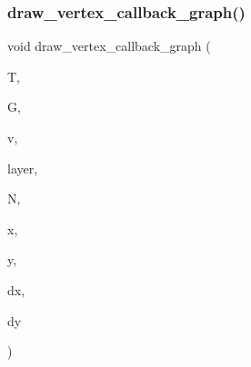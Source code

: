 \subsubsection{\texorpdfstring{draw\+\_\+vertex\+\_\+callback\+\_\+graph()}{draw\_vertex\_callback\_graph()}}
{\footnotesize\ttfamily void draw\+\_\+vertex\+\_\+callback\+\_\+graph (\begin{DoxyParamCaption}\item[{\mbox{\hyperlink{classtree}{tree}} $\ast$}]{T,  }\item[{\mbox{\hyperlink{classmp__graphics}{mp\+\_\+graphics}} $\ast$}]{G,  }\item[{\mbox{\hyperlink{galois_8h_a09fddde158a3a20bd2dcadb609de11dc}{I\+NT}} $\ast$}]{v,  }\item[{\mbox{\hyperlink{galois_8h_a09fddde158a3a20bd2dcadb609de11dc}{I\+NT}}}]{layer,  }\item[{\mbox{\hyperlink{classtree__node}{tree\+\_\+node}} $\ast$}]{N,  }\item[{\mbox{\hyperlink{galois_8h_a09fddde158a3a20bd2dcadb609de11dc}{I\+NT}}}]{x,  }\item[{\mbox{\hyperlink{galois_8h_a09fddde158a3a20bd2dcadb609de11dc}{I\+NT}}}]{y,  }\item[{\mbox{\hyperlink{galois_8h_a09fddde158a3a20bd2dcadb609de11dc}{I\+NT}}}]{dx,  }\item[{\mbox{\hyperlink{galois_8h_a09fddde158a3a20bd2dcadb609de11dc}{I\+NT}}}]{dy }\end{DoxyParamCaption})}

\mbox{\label{treedraw_8_c_ad34729af2cc5821141def2a0b73e473c}} 
